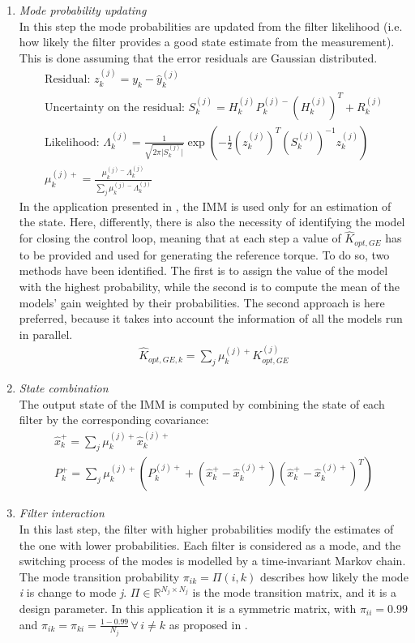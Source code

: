 \begin{enumerate}
\item \textit{Mode probability updating}\\
In this step the mode probabilities are updated from the filter likelihood (i.e. how likely the filter provides a good state estimate from the measurement). This is done assuming that the error residuals are Gaussian distributed.  
\begin{gather}
  \text{Residual: } z_k^{(j)} = y_k - \hat{y}_k^{(j)}\\
  \text{Uncertainty on the residual: }S_k^{(j)} = H_k^{(j)} P_k^{(j)-} (H_k^{(j)})^T + R_k^{(j)}\\
  \text{Likelihood: } \Lambda_k^{(j)} = \frac{1}{\sqrt{2 \pi \lvert S_k^{(j)} \rvert}} \exp{\left(-\frac{1}{2}\left(z_k^{(j)}\right)^T \left(S_k^{(j)}\right)^{-1} z_k^{(j)}\right)}\\
  \mu_k^{(j)+} = \frac{\mu_k^{(j)-}\Lambda_k^{(j)}}{\sum_{j} \mu_k^{(j)-}\Lambda_k^{(j)}}
\end{gather}
In the application presented in \cite{kalman_based_IMM}, the IMM is used only for an estimation of the state. Here, differently, there is also the necessity of identifying the model for closing the control loop, meaning that at each step a value of $\hat{K}_{opt,GE}$ has to be provided and used for generating the reference torque. To do so, two methods have been identified. The first is to assign the value of the model with the highest probability, while the second is to compute the mean of the models' gain weighted by their probabilities. The second approach is here preferred, because it takes into account the information of all the models run in parallel.
\begin{gather}
\hat{K}_{opt,GE,k} = \sum_j \mu_k^{(j)+} K_{opt,GE}^{(j)}
\end{gather}

\item \textit{State combination}\\
The output state of the IMM is computed by combining the state of each filter by the corresponding covariance:
\begin{gather}
  \hat{x}_k^+ = \sum_j \mu_k^{(j)+} \hat{x}_k^{(j)+}\\
  P_k^+ = \sum_j \mu_k^{(j)+} \left(P_k^{(j)+} + \left(\hat{x}_k^+ - \hat{x}_k^{(j)+}\right)\left(\hat{x}_k^+ - \hat{x}_k^{(j)+}\right)^T\right)
\end{gather}

\item \textit{Filter interaction}\\
In this last step, the filter with higher probabilities modify the estimates of the one with lower probabilities. Each filter is considered as a mode, and the switching process of the modes is modelled by a time-invariant Markov chain. The mode transition probability $\pi_{ik} = \Pi(i, k)$ describes how likely the mode \textit{i} is change to mode \textit{j}. $\Pi \in \mathbb{R}^{N_j \times N_j}$ is the mode transition matrix, and it is a design parameter. In this application it is a symmetric matrix, with $\pi_{ii}=0.99$ and $\pi_{ik}=\pi_{ki}=\frac{1 - 0.99}{N_j} \,\forall \, i\neq k $ as proposed in \cite{kalman_based_IMM}.


\end{enumerate}
